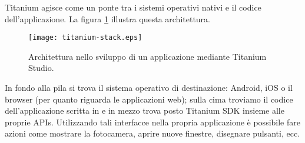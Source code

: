			Titanium agisce come un ponte tra i sistemi operativi nativi e il 
			codice dell'applicazione. La figura \ref{fig:ti_stack} illustra 
			questa architettura.
			\begin{figure}[h]
				\centering
				\texttt{[image: titanium-stack.eps]}
				\caption{
					Architettura nello sviluppo di un applicazione \crossplat{} 
					mediante Titanium Studio.
				}
				\label{fig:ti_stack}
			\end{figure}
			In fondo alla pila si trova il sistema 
			operativo di destinazione: Android, iOS o il browser (per quanto 
			riguarda le applicazioni web); sulla cima troviamo il codice 
			dell'applicazione scritta in \js{} e in mezzo trova posto
			Titanium SDK insieme alle proprie APIs. Utilizzando tali interfacce 
			nella propria applicazione è possibile fare azioni come mostrare la 
			fotocamera,	aprire nuove finestre, disegnare pulsanti, ecc. 
			
